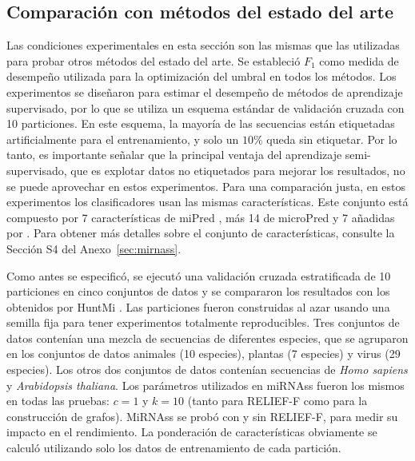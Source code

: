 \subsection{Comparación con métodos del estado del arte}
Las condiciones experimentales en esta sección son las mismas que las utilizadas para probar otros métodos del estado del arte. Se estableció $ F_{1} $ como
medida de desempeño utilizada para la optimización del umbral en todos los métodos. Los experimentos se diseñaron para estimar el desempeño de métodos de
aprendizaje supervisado, por lo que se utiliza un esquema estándar de validación cruzada con 10 particiones. En este esquema, la mayoría de las secuencias
están etiquetadas artificialmente para el entrenamiento, y solo un $ 10 \% $ queda sin etiquetar. Por lo tanto, es importante señalar que la principal
ventaja del aprendizaje semi-supervisado, que es explotar datos no etiquetados para mejorar los resultados, no se puede aprovechar en estos experimentos.
Para una comparación justa, en estos experimentos los clasificadores usan las mismas características. Este conjunto está compuesto por 7 características de
miPred \citep{ng2007novo}, más 14 de microPred \citep{batuwita2009micropred} y 7 añadidas por \cite{gudys2013huntmi}. Para obtener más detalles sobre el
conjunto de características, consulte la Sección S4 del Anexo~\ref{sec:mirnass}.

Como antes se especificó, se ejecutó una validación cruzada estratificada de 10 particiones en cinco conjuntos de datos y se compararon los resultados con
los obtenidos por HuntMi \citep{gudys2013huntmi}. Las particiones fueron construidas al azar usando una semilla fija para tener experimentos totalmente
reproducibles. Tres conjuntos de datos contenían una mezcla de secuencias de diferentes especies, que se agruparon en los conjuntos de datos animales (10
especies), plantas (7 especies) y virus (29 especies). Los otros dos conjuntos de datos contenían secuencias de \textit{Homo sapiens} y \textit{Arabidopsis
thaliana}. Los parámetros utilizados en miRNAss fueron los mismos en todas las pruebas: $ c = 1 $ y $ k = 10 $ (tanto para RELIEF-F como para la construcción
de grafos). MiRNAss se probó con y sin RELIEF-F, para medir su impacto en el rendimiento. La ponderación de características obviamente se calculó
utilizando solo los datos de entrenamiento de cada partición.


